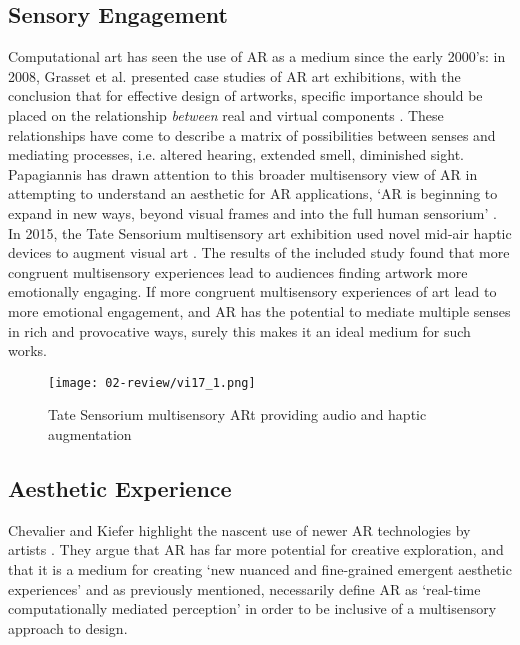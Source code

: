 \subsection{Sensory Engagement}\label{sec: ar-arts-sensory}
Computational art has seen the use of AR as a medium since the early 2000's: in 2008, Grasset et al. presented case studies of AR art exhibitions, with the conclusion that for effective design of artworks, specific importance should be placed on the relationship \textit{between} real and virtual components \citeyearpar{grasset2008}. These relationships have come to describe a matrix of possibilities between senses and mediating processes, i.e. altered hearing, extended smell, diminished sight. Papagiannis has drawn attention to this broader multisensory view of AR in attempting to understand an aesthetic for AR applications, `AR is beginning to expand in new ways, beyond visual frames and into the full human sensorium' \citeyearpar{papagiannis2014}. In 2015, the Tate Sensorium multisensory art exhibition used novel mid-air haptic devices to augment visual art \citep{vi2017a}. The results of the included study found that more congruent multisensory experiences lead to audiences finding artwork more emotionally engaging. If more congruent multisensory experiences of art lead to more emotional engagement, and AR has the potential to mediate multiple senses in rich and provocative ways, surely this makes it an ideal medium for such works. 

\begin{figure}[ht]
    \centering
    \texttt{[image: 02-review/vi17\_1.png]}
    \captionsetup{justification=centering,margin=1.5cm}
    \caption{Tate Sensorium multisensory ARt providing audio and haptic augmentation \citep[in][]{vi2017a}}\label{fig: tate}
\end{figure}

\subsection{Aesthetic Experience}\label{sec: ar-arts-aesthetics}
Chevalier and Kiefer highlight the nascent use of newer AR technologies by artists \citeyearpar{chevalier2020}. They argue that AR has far more potential for creative exploration, and that it is a medium for creating `new nuanced and fine-grained emergent aesthetic experiences' and as previously mentioned, necessarily define AR as `real-time computationally mediated perception' in order to be inclusive of a multisensory approach to design. 

